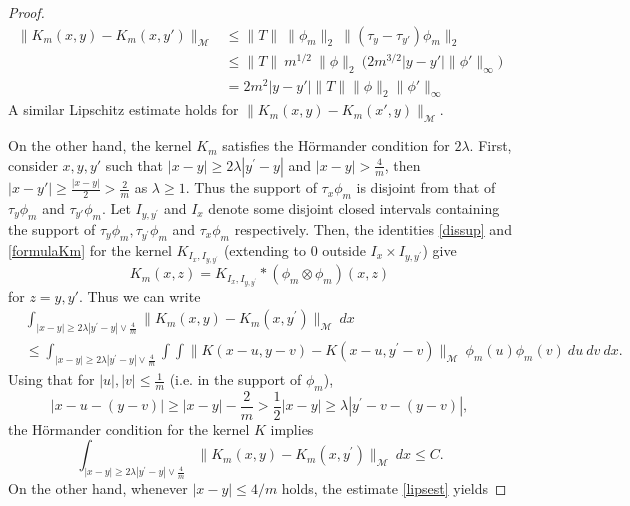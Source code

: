 \documentclass[10pt,a4paper]{amsart}
\begin{document}
\begin{proof}
\begin{align}
  \nonumber \| K_m(x,y)-K_m(x,y')\|_\mathcal M&\leq                                           \|T\|  \ \| \phi_m\|_{2} \ \| (\tau_y-\tau_{y'})\phi_m\|_2 \\ \nonumber 
  &\leq \|T\| \ m^{1/2} \ \|\phi\|_2 \ \big( 2 m^{3/2}  {|y-y'|} \|\phi'\|_{\infty}\big)\\ \label{lipsest} & =
2  m^2 {|y-y'|} \|T\| \|\phi\|_2 \|\phi'\|_{\infty}
\end{align}
A similar Lipschitz estimate holds for $\| K_m(x,y)-K_m(x',y)\|_\mathcal M$. 
      
On the other hand, the kernel $K_m$ satisfies the Hörmander condition for $2\lambda$. First, consider $x,y,y'$ such that $|x-y| \geq 2\lambda |y^\prime - y|$
and $|x-y| > \frac{4}{m}$, then $|x-y'|\geq \frac{|x-y|}2>\frac 2 m$ as $\lambda\geq 1$. Thus the support of $\tau_x {\phi}_m$ is
disjoint from that of $\tau_y \phi_m$ and $\tau_{y'} \phi_m$. Let
$I_{y,y^\prime}$ and $I_x$ denote some disjoint closed intervals containing
the support of $\tau_y \phi_m,\tau_{y^\prime}\phi_m$ and
$\tau_x {\phi}_m$ respectively. Then, the identities \eqref{dissup} and \eqref{formulaKm} for the kernel
$K_{I_x,I_{y,y^\prime}}$ (extending to 0 outside $I_x\times I_{y,y^\prime}$) give
$$ K_m(x,z)= K_{I_x,I_{y,y^\prime}}*({\phi}_m\otimes \phi_m)(x,z)$$
for $z=y,y'$. Thus we can write
        \begin{align*}
            &\int_{|x-y| \geq 2\lambda |y^\prime - y|\vee \frac{4}{ m} } \|K_m(x,y)-K_m(x,y^\prime)\|_{\mathcal{M}} \ dx \\
            &\leq\int_{|x-y| \geq 2\lambda |y^\prime -y|\vee \frac{4}{m} } \int \int \big\| {K}(x - u,y -{v}) - {K}(x - {u},y^\prime - {v}) \big\|_{\mathcal{M}} \ {\phi_m}(u) \phi_m(v)\ du \ dv \ dx.
        \end{align*}
        Using that for $|u|,|v|\leq \frac{1}{m}$ (i.e. in the support of $\phi_m$), 
$$|x - u - (y -{v}) | \geq |x-y| - \frac{2}{m} > \frac{1}{2} |x-y| \geq \lambda |y^\prime-v -(y-v)|,$$
the H\"ormander condition for the kernel $K$ implies
    $$\int_{|x-y| \geq 2\lambda |y^\prime - y|\vee \frac{4}{ m}} \|K_m(x,y)-K_m(x,y^\prime)\|_{\mathcal{M}} \ dx \leq C.$$ 
    On the other hand, whenever $|x -y | \leq 4/ m$ holds, the estimate \eqref{lipsest} yields

\end{proof}
\end{document}
